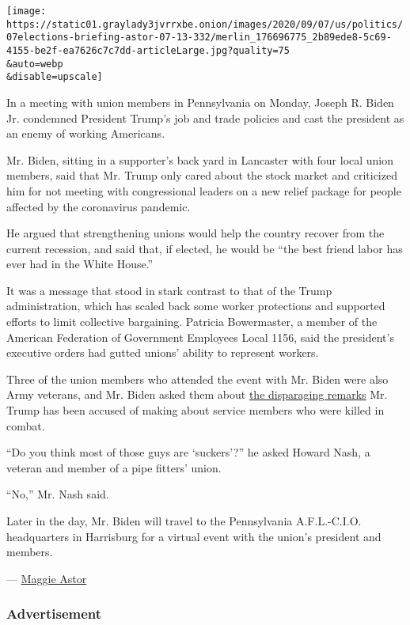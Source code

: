 \texttt{[image: https://static01.graylady3jvrrxbe.onion/images/2020/09/07/us/politics/07elections-briefing-astor-07-13-332/merlin\_176696775\_2b89ede8-5c69-4155-be2f-ea7626c7c7dd-articleLarge.jpg?quality=75\\\&auto=webp\\\&disable=upscale]}

In a meeting with union members in Pennsylvania on Monday, Joseph R.
Biden Jr. condemned President Trump's job and trade policies and cast
the president as an enemy of working Americans.

Mr. Biden, sitting in a supporter's back yard in Lancaster with four
local union members, said that Mr. Trump only cared about the stock
market and criticized him for not meeting with congressional leaders on
a new relief package for people affected by the coronavirus pandemic.

He argued that strengthening unions would help the country recover from
the current recession, and said that, if elected, he would be ``the best
friend labor has ever had in the White House.''

It was a message that stood in stark contrast to that of the Trump
administration, which has scaled back some worker protections and
supported efforts to limit collective bargaining. Patricia Bowermaster,
a member of the American Federation of Government Employees Local 1156,
said the president's executive orders had gutted unions' ability to
represent workers.

Three of the union members who attended the event with Mr. Biden were
also Army veterans, and Mr. Biden asked them about
\href{https://www.nytimes3xbfgragh.onion/2020/09/04/us/politics/trump-veterans-losers.html}{the
disparaging remarks} Mr. Trump has been accused of making about service
members who were killed in combat.

``Do you think most of those guys are `suckers'?'' he asked Howard Nash,
a veteran and member of a pipe fitters' union.

``No,'' Mr. Nash said.

Later in the day, Mr. Biden will travel to the Pennsylvania
A.F.L.-C.I.O. headquarters in Harrisburg for a virtual event with the
union's president and members.

--- \href{https://www.nytimes3xbfgragh.onion/by/maggie-astor}{Maggie
Astor}

\hypertarget{advertisement-1}{%
\subsubsection{Advertisement}\label{advertisement-1}}

